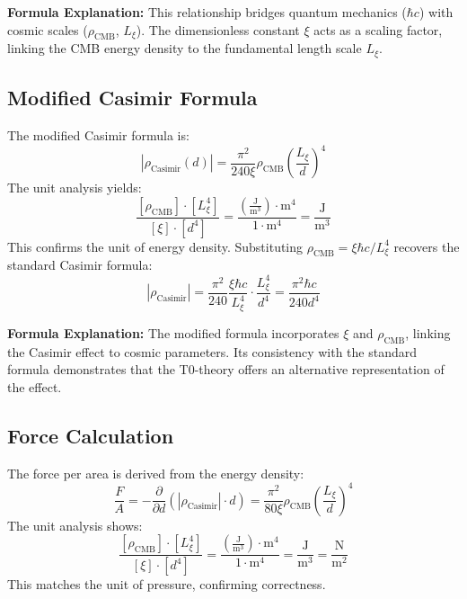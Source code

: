 \documentclass[12pt,a4paper]{article}
\begin{document}
\textbf{Formula Explanation:} This relationship bridges quantum mechanics ($\hbar c$) with cosmic scales ($\rho_{\text{CMB}}$, $L_\xi$). The dimensionless constant $\xi$ acts as a scaling factor, linking the CMB energy density to the fundamental length scale $L_\xi$.

\subsection{Modified Casimir Formula}
The modified Casimir formula is:
\begin{equation}
	|\rho_{\text{Casimir}}(d)| = \frac{\pi^2}{240 \xi} \rho_{\text{CMB}} \left( \frac{L_\xi}{d} \right)^4
\end{equation}
The unit analysis yields:
\begin{equation}
	\frac{[\rho_{\text{CMB}}] \cdot [L_\xi^4]}{[\xi] \cdot [d^4]} = \frac{\left( \frac{\text{J}}{\text{m}^3} \right) \cdot \text{m}^4}{1 \cdot \text{m}^4} = \frac{\text{J}}{\text{m}^3}
\end{equation}
This confirms the unit of energy density. Substituting $\rho_{\text{CMB}} = \xi \hbar c / L_\xi^4$ recovers the standard Casimir formula:
\begin{equation}
	|\rho_{\text{Casimir}}| = \frac{\pi^2}{240} \frac{\xi \hbar c}{L_\xi^4} \cdot \frac{L_\xi^4}{d^4} = \frac{\pi^2 \hbar c}{240 d^4}
\end{equation}

\textbf{Formula Explanation:} The modified formula incorporates $\xi$ and $\rho_{\text{CMB}}$, linking the Casimir effect to cosmic parameters. Its consistency with the standard formula demonstrates that the T0-theory offers an alternative representation of the effect.

\subsection{Force Calculation}
The force per area is derived from the energy density:
\begin{equation}
	\frac{F}{A} = -\frac{\partial}{\partial d} \left( |\rho_{\text{Casimir}}| \cdot d \right) = \frac{\pi^2}{80 \xi} \rho_{\text{CMB}} \left( \frac{L_\xi}{d} \right)^4
\end{equation}
The unit analysis shows:
\begin{equation}
	\frac{[\rho_{\text{CMB}}] \cdot [L_\xi^4]}{[\xi] \cdot [d^4]} = \frac{\left( \frac{\text{J}}{\text{m}^3} \right) \cdot \text{m}^4}{1 \cdot \text{m}^4} = \frac{\text{J}}{\text{m}^3} = \frac{\text{N}}{\text{m}^2}
\end{equation}
This matches the unit of pressure, confirming correctness.
\end{document}
